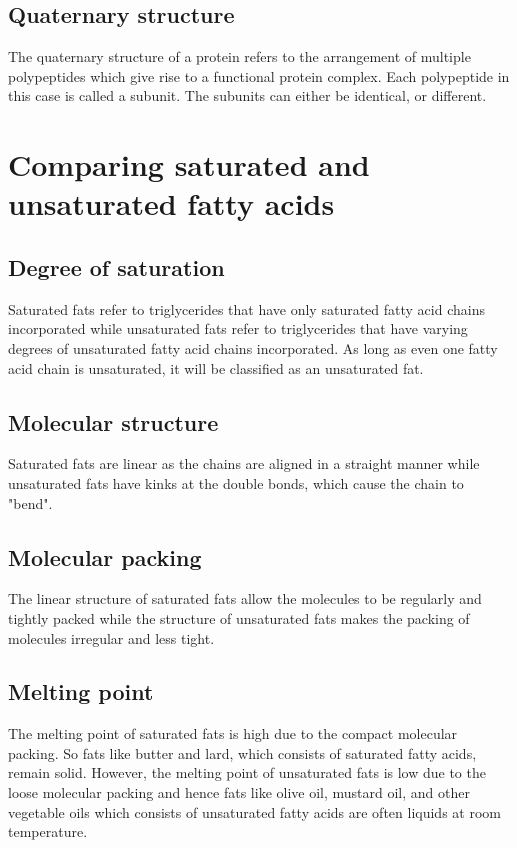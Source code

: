 \documentclass[11pt]{article}
\begin{document}
\subsection{Quaternary structure}
\label{sec:org116c3ff}
The quaternary structure of a protein refers to the arrangement of multiple polypeptides which give rise to a functional protein complex. Each polypeptide in this case is called a subunit. The subunits can either be identical, or different.

\newpage

\section{Comparing saturated and unsaturated fatty acids}
\label{sec:org9c8029e}

\subsection{Degree of saturation}
\label{sec:org184e8b4}
Saturated fats refer to triglycerides that have only saturated fatty acid chains incorporated while unsaturated fats refer to triglycerides that have varying degrees of unsaturated fatty acid chains incorporated. As long as even one fatty acid chain is unsaturated, it will be classified as an unsaturated fat.

\subsection{Molecular structure}
\label{sec:org894da0a}
Saturated fats are linear as the chains are aligned in a straight manner while unsaturated fats have kinks at the double bonds, which cause the chain to "bend".

\subsection{Molecular packing}
\label{sec:org7384ec2}
The linear structure of saturated fats allow the molecules to be regularly and tightly packed while the structure of unsaturated fats makes the packing of molecules irregular and less tight.

\subsection{Melting point}
\label{sec:org5c65b53}
The melting point of saturated fats is high due to the compact molecular packing. So fats like butter and lard, which consists of saturated fatty acids, remain solid. However, the melting point of unsaturated fats is low due to the loose molecular packing and hence fats like olive oil, mustard oil, and other vegetable oils which consists of unsaturated fatty acids are often liquids at room temperature.
\end{document}
